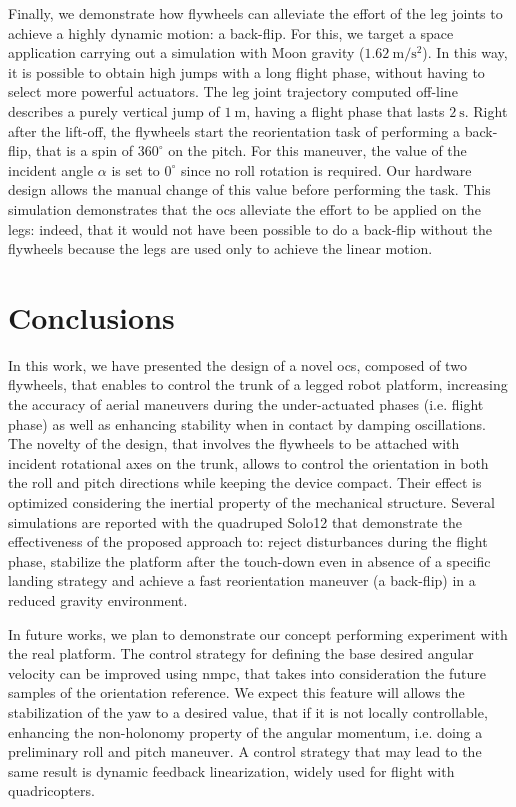 \documentclass[sensors,article,submit,pdftex,moreauthors]{Definitions/mdpi}
\begin{document}
Finally, we demonstrate how flywheels can alleviate the effort of the leg joints to achieve a highly dynamic motion: a back-flip. 
For this, we target a space application carrying out a simulation with Moon gravity ($1.62 \ \mathrm{m/s^2}$).
In this way, it is possible to obtain high jumps with a long flight phase, without having to select more powerful actuators.  
The leg joint trajectory computed off-line describes a purely vertical jump of $1 \ \mathrm{m}$, having a flight phase that lasts $2 \ \mathrm{s}$.
Right after the lift-off, the flywheels start the reorientation task of performing a back-flip, that is a spin of $360^\circ$ on the pitch.
For this maneuver, the value of the incident angle $\alpha$ is set to $0^\circ$ since no roll rotation is required.
Our hardware design allows the manual change of this value before performing the task.
This simulation demonstrates that the \gls{ocs} alleviate the effort to be applied on the legs: indeed, that it would not have been possible to do a back-flip without the flywheels because the legs are used only to achieve the linear motion.


\section{Conclusions}
\label{sec:conclusions}

In this work, we have presented the design of a novel \gls{ocs}, composed of two flywheels, that enables to control the trunk of a legged robot platform, 
increasing the accuracy of aerial maneuvers during the under-actuated phases (i.e. flight phase) as well as 
enhancing stability when in contact by damping oscillations.
The novelty of the design, that involves the flywheels to be attached with incident rotational axes on the trunk, allows to control the orientation
in both the roll and pitch directions while keeping the device compact. Their effect is optimized considering the inertial property of the mechanical structure. 
Several simulations are reported with the quadruped Solo12 that demonstrate the effectiveness of the proposed approach to: 
reject disturbances during the flight phase, stabilize the platform after the touch-down even in absence of a specific landing strategy and 
achieve a fast reorientation maneuver (a back-flip) in a reduced gravity environment. 

In future works, we plan to demonstrate our concept performing experiment with the real platform. The control strategy for defining the base desired angular velocity can be improved using \gls{nmpc}, that takes into consideration the future samples of the orientation reference.
We expect this feature will allows the stabilization of the yaw to a desired value, that if it is not locally controllable, enhancing the non-holonomy property of the angular momentum, i.e. doing a preliminary roll and pitch maneuver. 
A control strategy that may lead to the same result is dynamic feedback linearization, widely used for flight with quadricopters.
\end{document}
